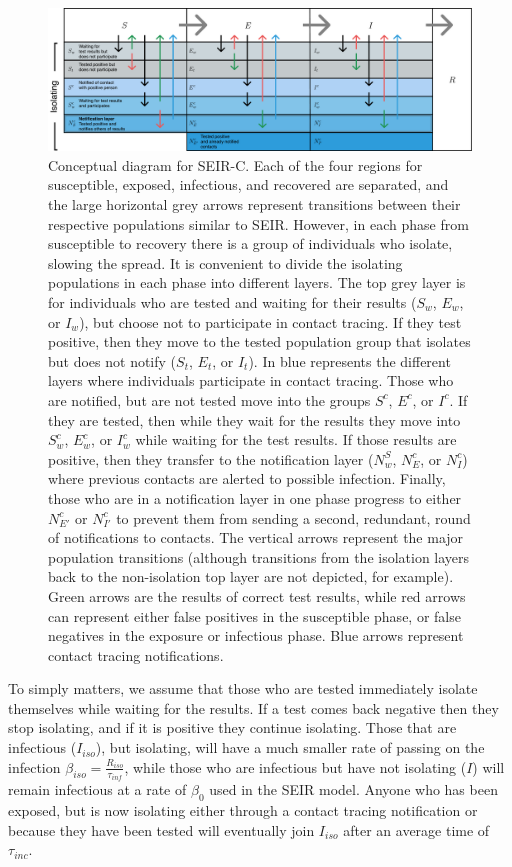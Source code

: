 \documentclass[notitlepage, superscriptaddress]{revtex4-2}
\begin{document}
\begin{figure}
\centering
\includegraphics[width=7in]{SEIR-C_diagram.pdf}
\caption{\label{f:SEIR-C}
 Conceptual diagram for SEIR-C. Each of the four regions for susceptible, exposed, infectious, and recovered are separated, and the large horizontal grey arrows represent transitions between their respective populations similar to SEIR. However, in each phase from susceptible to recovery there is a group of individuals who isolate, slowing the spread. It is convenient to divide the isolating populations in each phase into different layers. The top grey layer is for individuals who are tested and waiting for their results ($S_{w}$, $E_{w}$, or $I_{w}$), but choose not to participate in contact tracing. If they test positive, then they move to the tested population group that isolates but does not notify ($S_{t}$, $E_{t}$, or $I_{t}$). In blue represents the different layers where individuals participate in contact tracing. Those who are notified, but are not tested move into the groups $S^{c}$, $E^{c}$, or $I^{c}$. If they are tested, then while they wait for the results they move into $S^{c}_{w}$, $E^{c}_{w}$, or $I^{c}_{w}$ while waiting for the test results. If those results are positive, then they transfer to the notification layer ($N^{S}_{w}$, $N^{c}_{E}$, or $N^{c}_{I}$) where previous contacts are alerted to possible infection. Finally, those who are in a notification layer in one phase progress to either $N^{c}_{E'}$ or $N^{c}_{I'}$ to prevent them from sending a second, redundant, round of notifications to contacts. The vertical arrows represent the major population transitions (although transitions from the isolation layers back to the non-isolation top layer are not depicted, for example). Green arrows are the results of correct test results, while red arrows can represent either false positives in the susceptible phase, or false negatives in the exposure or infectious phase. Blue arrows represent contact tracing notifications.}
\end{figure}

To simply matters, we assume that those who are tested immediately isolate themselves while waiting for the results. If a test comes back negative then they stop isolating, and if it is positive they continue isolating. Those that are infectious ($I_{iso}$), but isolating, will have a much smaller rate of passing on the infection $\beta_{iso} = \frac{R_{iso}}{\tau_{inf}}$, while those who are infectious but have not isolating ($I$) will remain infectious at a rate of $\beta_{0}$ used in the SEIR model. Anyone who has been exposed, but is now isolating either through a contact tracing notification or because they have been tested will eventually join $I_{iso}$ after an average time of $\tau_{inc}$. 
\end{document}
